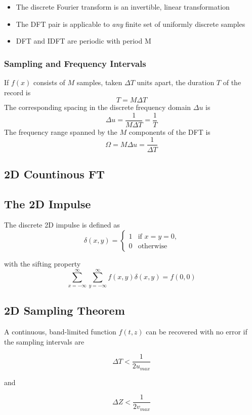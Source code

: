 \begin{itemize}
\item The discrete Fourier transform is an invertible, linear transformation
\item The DFT pair is applicable to \emph{any} finite set of uniformly discrete samples
\item DFT and IDFT are periodic with period M
\end{itemize}
 
\subsubsection{Sampling and Frequency Intervals }
If $f(x)$ consists of $M$ samples, taken $\Delta T$ units apart, the duration $T$ of the record is
\begin{equation}
	T = M \Delta T
\end{equation}
The corresponding spacing in the discrete frequency domain $\Delta u$ is
\begin{equation}
	\Delta u = \frac{1}{M \Delta T} = \frac{1}{T}
\end{equation}
The frequency range spanned by the $M$ components of the DFT is
\begin{equation}
	\Omega = M \Delta u = \frac{1}{\Delta T}
\end{equation} 

\subsection{2D Countinous FT } 
\subsection{The 2D Impulse }
The discrete 2D impulse is defined as
\begin{equation}
\delta(x,y) = 
\begin{cases} 1 & \text{if $x=y=0$,}
\\
0 &\text{otherwise}
\end{cases}
\end{equation}

with the sifting property
\begin{equation}
\sum_{x=-\infty}^{\infty}\sum_{y=-\infty}^{\infty}f(x,y) \delta(x,y) = f(0,0)
\end{equation}

\subsection{2D Sampling Theorem}
A continuous, band-limited function $f(t,z)$ can be recovered with no error if the sampling intervals are\\
 \begin{minipage}{0.4\textwidth}
   \[
   \Delta T < \dfrac{1}{2 u_{max}}
   \]
 \end{minipage} 
and
  \begin{minipage}{0.4\textwidth}
    \[
    \Delta Z < \dfrac{1}{2 v_{max}}
    \]
  \end{minipage} 
  
